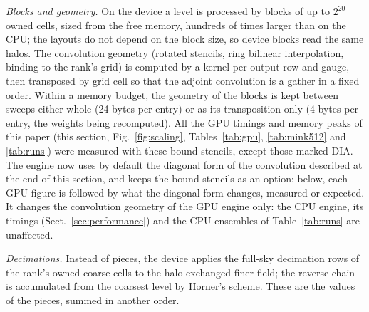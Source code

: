 \documentclass{aa}
\begin{document}
\emph{Blocks and geometry.} On the device a level is processed by blocks of up to $2^{20}$ owned cells, sized from the free memory, hundreds of times larger than on the CPU; the layouts do not depend on the block size, so device blocks read the same halos. The convolution geometry (rotated stencils, ring bilinear interpolation, binding to the rank's grid) is computed by a kernel per output row and gauge, then transposed by grid cell so that the adjoint convolution is a gather in a fixed order. Within a memory budget, the geometry of the blocks is kept between sweeps either whole (24 bytes per entry) or as its transposition only (4 bytes per entry, the weights being recomputed). All the GPU timings and memory peaks of this paper (this section, Fig.~\ref{fig:scaling}, Tables~\ref{tab:gpu}, \ref{tab:mink512} and \ref{tab:runs}) were measured with these bound stencils, except those marked DIA. The engine now uses by default the diagonal form of the convolution described at the end of this section, and keeps the bound stencils as an option; below, each GPU figure is followed by what the diagonal form changes, measured or expected. It changes the convolution geometry of the GPU engine only: the CPU engine, its timings (Sect.~\ref{sec:performance}) and the CPU ensembles of Table~\ref{tab:runs} are unaffected.

\emph{Decimations.} Instead of pieces, the device applies the full-sky decimation rows of the rank's owned coarse cells to the halo-exchanged finer field; the reverse chain is accumulated from the coarsest level by Horner's scheme. These are the values of the pieces, summed in another order.
\end{document}
